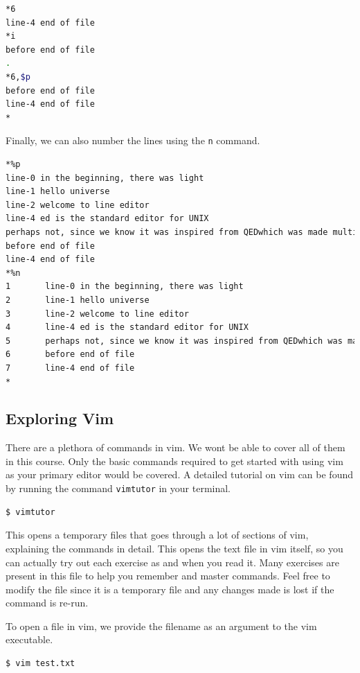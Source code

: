 \begin{lstlisting}[language=bash]
*6
line-4 end of file
*i
before end of file
.
*6,$p
before end of file
line-4 end of file
*
\end{lstlisting}

Finally, we can also number the lines using the \texttt{n} command.

\begin{lstlisting}[language=bash]
*%p
line-0 in the beginning, there was light
line-1 hello universe
line-2 welcome to line editor
line-4 ed is the standard editor for UNIX
perhaps not, since we know it was inspired from QEDwhich was made multiple times by thompson and ritchiebefore ed was made.
before end of file
line-4 end of file
*%n
1       line-0 in the beginning, there was light
2       line-1 hello universe
3       line-2 welcome to line editor
4       line-4 ed is the standard editor for UNIX
5       perhaps not, since we know it was inspired from QEDwhich was made multiple times by thompson and ritchiebefore ed was made.
6       before end of file
7       line-4 end of file
*
\end{lstlisting}

\vfill
\pagebreak
\subsection{Exploring Vim}

There are a plethora of commands in vim.
We wont be able to cover all of them in this course.
Only the basic commands required to get started
with using vim as your primary editor would be
covered. A detailed tutorial on vim can be found
by running the command \texttt{vimtutor} in your terminal.

\begin{lstlisting}
$ vimtutor
\end{lstlisting}

This opens a temporary files that goes through a lot of
sections of vim, explaining the commands in detail.
This opens the text file in vim itself, so you can
actually try out each exercise as and when you read it.
Many exercises are present in this file to help you
remember and master commands. Feel free to modify the
file since it is a temporary file and any changes made
is lost if the command is re-run.

To open a file in vim, we provide the filename as an argument
to the vim executable.

\begin{lstlisting}[language=bash]
$ vim test.txt
\end{lstlisting}


